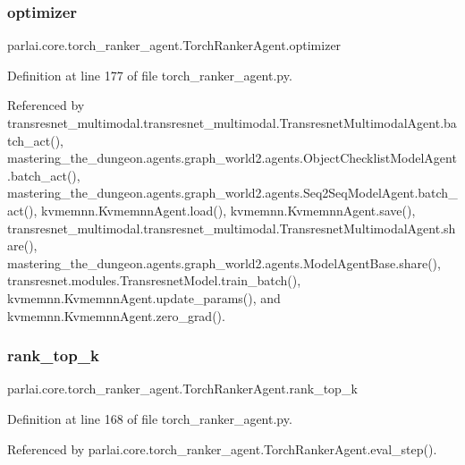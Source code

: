 \subsubsection{\texorpdfstring{optimizer}{optimizer}}
{\footnotesize\ttfamily parlai.\+core.\+torch\+\_\+ranker\+\_\+agent.\+Torch\+Ranker\+Agent.\+optimizer}



Definition at line 177 of file torch\+\_\+ranker\+\_\+agent.\+py.



Referenced by transresnet\+\_\+multimodal.\+transresnet\+\_\+multimodal.\+Transresnet\+Multimodal\+Agent.\+batch\+\_\+act(), mastering\+\_\+the\+\_\+dungeon.\+agents.\+graph\+\_\+world2.\+agents.\+Object\+Checklist\+Model\+Agent.\+batch\+\_\+act(), mastering\+\_\+the\+\_\+dungeon.\+agents.\+graph\+\_\+world2.\+agents.\+Seq2\+Seq\+Model\+Agent.\+batch\+\_\+act(), kvmemnn.\+Kvmemnn\+Agent.\+load(), kvmemnn.\+Kvmemnn\+Agent.\+save(), transresnet\+\_\+multimodal.\+transresnet\+\_\+multimodal.\+Transresnet\+Multimodal\+Agent.\+share(), mastering\+\_\+the\+\_\+dungeon.\+agents.\+graph\+\_\+world2.\+agents.\+Model\+Agent\+Base.\+share(), transresnet.\+modules.\+Transresnet\+Model.\+train\+\_\+batch(), kvmemnn.\+Kvmemnn\+Agent.\+update\+\_\+params(), and kvmemnn.\+Kvmemnn\+Agent.\+zero\+\_\+grad().

\mbox{\label{classparlai_1_1core_1_1torch__ranker__agent_1_1TorchRankerAgent_a1205be489b10e7870d865844c05d7fec}} 
\subsubsection{\texorpdfstring{rank\+\_\+top\+\_\+k}{rank\_top\_k}}
{\footnotesize\ttfamily parlai.\+core.\+torch\+\_\+ranker\+\_\+agent.\+Torch\+Ranker\+Agent.\+rank\+\_\+top\+\_\+k}



Definition at line 168 of file torch\+\_\+ranker\+\_\+agent.\+py.



Referenced by parlai.\+core.\+torch\+\_\+ranker\+\_\+agent.\+Torch\+Ranker\+Agent.\+eval\+\_\+step().

